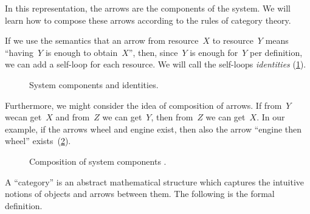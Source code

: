 In this representation, the arrows are the components of the system.
We will learn how to compose these arrows according to the rules of category theory.

If we use the semantics that an arrow from resource~$X$ to resource~$Y$ means ``having~$Y$ is
enough to obtain~$X$'', then, since~$Y$ is enough for~$Y$ per definition, we can add a self-loop for each
resource. We will call the self-loops \emph{identities} (\cref{fig:e3}).

\begin{figure}[h!]
    \centering
    \caption{System components and identities. \label{fig:e3}}
\end{figure}

Furthermore, we might consider the idea of composition of arrows. If from~$Y$ wecan get~$X$ and from~$Z$ we can get~$Y$, then from~$Z$ we can get~$X$. In our example, if the arrows \textsf{wheel} and \textsf{engine} exist, then also the arrow ``\textsf{engine then wheel}'' exists~(\cref{fig:e4}).

\begin{figure}[h!]
    \centering
    
    \caption{Composition of system components \label{fig:e4}.}
\end{figure}

A ``category'' is an abstract mathematical
structure which captures the intuitive notions of objects and arrows between them.
The following is the formal definition.

